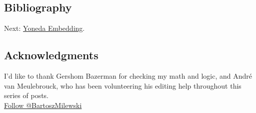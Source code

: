 \subsection{Bibliography}\label{bibliography}

Next:
\href{https://bartoszmilewski.com/2015/10/28/yoneda-embedding/}{Yoneda
Embedding}.

\subsection{Acknowledgments}\label{acknowledgments}

I'd like to thank Gershom Bazerman for checking my math and logic, and
André van Meulebrouck, who has been volunteering his editing help
throughout this series of posts.\\
\href{https://twitter.com/BartoszMilewski}{Follow @BartoszMilewski}
